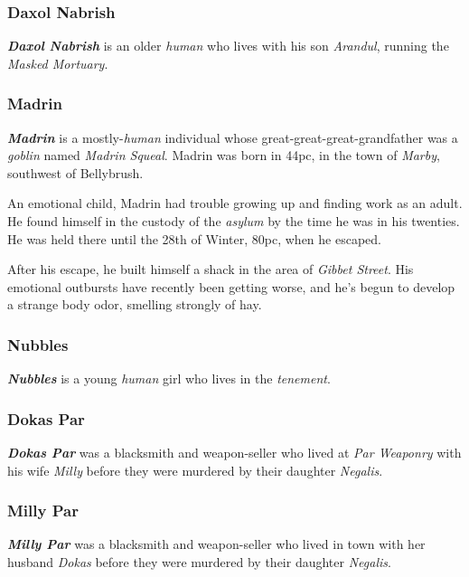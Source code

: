 \documentclass[11pt]{teraum_adventure}
\begin{document}
\subsubsection*{Daxol Nabrish}
\label{sec:org8c823b7}
\textbf{\emph{Daxol Nabrish}} is an older \emph{human} who lives with his son
\emph{Arandul}, running the \emph{Masked Mortuary}.
\subsubsection*{Madrin}
\label{sec:orgdbd2c51}
\textbf{\emph{Madrin}} is a mostly-\emph{human} individual whose
great-great-great-grandfather was a \emph{goblin} named \emph{Madrin Squeal}.
Madrin was born in 44pc, in the town of \emph{Marby}, southwest of
Bellybrush.

An emotional child, Madrin had trouble growing up and finding work as
an adult. He found himself in the custody of the \emph{asylum} by the time
he was in his twenties. He was held there until the 28th of Winter,
80pc, when he escaped.

After his escape, he built himself a shack in the area of \emph{Gibbet
Street}. His emotional outbursts have recently been getting worse, and
he's begun to develop a strange body odor, smelling strongly of hay.
\subsubsection*{Nubbles}
\label{sec:org596f949}
\textbf{\emph{Nubbles}} is a young \emph{human} girl who lives in the \emph{tenement}.
\subsubsection*{Dokas Par}
\label{sec:orgd5d879e}
\textbf{\emph{Dokas Par}} was a blacksmith and weapon-seller who lived at \emph{Par
Weaponry} with his wife \emph{Milly} before they were murdered by their
daughter \emph{Negalis}.
\subsubsection*{Milly Par}
\label{sec:orgc368ce1}
\textbf{\emph{Milly Par}} was a blacksmith and weapon-seller who lived in town
with her husband \emph{Dokas} before they were murdered by their daughter
\emph{Negalis}.
\end{document}

